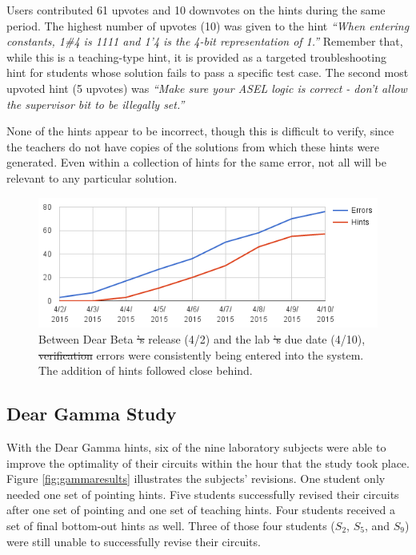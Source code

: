 \documentclass[12pt,twoside]{mitthesis}
\providecommand{\DIFaddtex}[1]{{\protect\color{blue}\uwave{#1}}} %
\providecommand{\DIFdeltex}[1]{{\protect\color{red}\sout{#1}}}                      %
\providecommand{\DIFaddFL}[1]{\DIFadd{#1}} %
\providecommand{\DIFdelFL}[1]{\DIFdel{#1}} %
\providecommand{\DIFaddbeginFL}{} %
\providecommand{\DIFaddendFL}{} %
\providecommand{\DIFdelbeginFL}{} %
\providecommand{\DIFdelendFL}{} %
\providecommand{\DIFadd}[1]{\texorpdfstring{\DIFaddtex{#1}}{#1}} %
\providecommand{\DIFdel}[1]{\texorpdfstring{\DIFdeltex{#1}}{}} %
\begin{document}
{{{{{{{{{{Users contributed 61 upvotes and 10 downvotes on the hints during the same period. The highest number of upvotes (10) was given to the hint {\it ``When entering constants, 1\#4 is 1111 and 1'4 is the 4-bit representation of 1.''} Remember that, while this is a teaching-type hint, it is provided as a targeted troubleshooting hint for students whose solution fails to pass a specific test case. The second most upvoted hint (5 upvotes) was {\it ``Make sure your ASEL logic is correct - don't allow the supervisor bit to be illegally set.''} 

None of the hints appear to be incorrect, though this is difficult to verify, since the teachers do not have copies of the solutions from which these hints were generated. Even within a collection of hints for the same error, not all will be relevant to any particular solution.


\begin{figure}
\centering
\includegraphics[width=1.0\columnwidth]{Body/figures/classoverflow/cumulativeErrorsAndHints.png}
\caption{Between \DIFaddbeginFL \DIFaddFL{the }\DIFaddendFL Dear Beta \DIFdelbeginFL \DIFdelFL{'s }\DIFdelendFL release \DIFaddbeginFL \DIFaddFL{date }\DIFaddendFL (4/2) and the lab \DIFdelbeginFL \DIFdelFL{'s }\DIFdelendFL due date (4/10), \DIFdelbeginFL \DIFdelFL{verification }\DIFdelendFL \DIFaddbeginFL \DIFaddFL{autograder }\DIFaddendFL errors were consistently being entered into the system. The addition of hints followed close behind.}
\label{fig:betaengagement}
\end{figure}


\subsection{Dear Gamma Study}

With the Dear Gamma hints, six of the nine laboratory subjects were able to improve the optimality of their circuits within the hour that the study took place. Figure \ref{fig:gammaresults} illustrates the subjects' revisions. One student only needed one set of pointing hints. Five students successfully revised their circuits after one set of pointing and one set of teaching hints. Four students received a set of final bottom-out hints as well. Three of those four students ($S_2$, $S_5$, and $S_9$) were still unable to successfully revise their circuits. 

}}}}}}}}}}
\end{document}
